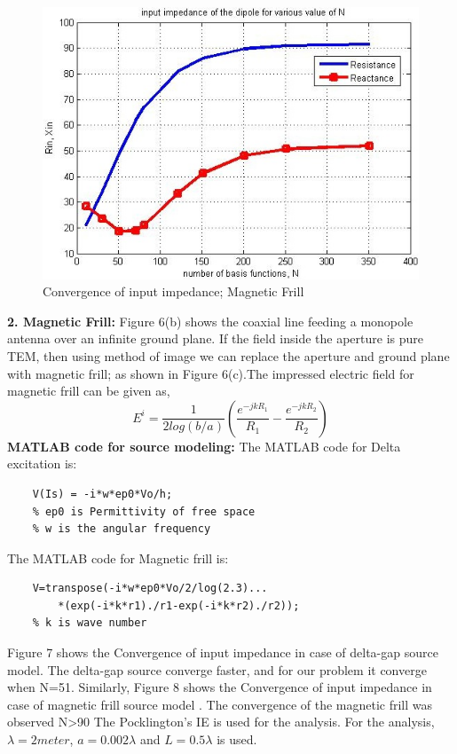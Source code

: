 \documentclass[aps,prstab,twocolumn,superscriptaddress,groupedaddress,showkeys,nofootinbib]{revtex4}  %
\begin{document}
\begin{figure}[here!]
\centering
\includegraphics[scale=0.5]{frill.jpg}
\caption{Convergence of input impedance; Magnetic Frill}
\end{figure}
\textbf{2. Magnetic Frill: } Figure 6(b) shows the coaxial line feeding a monopole antenna over an infinite ground plane. If the field inside the aperture is pure TEM, then using method of image we can replace the aperture and ground plane with magnetic frill; as shown in Figure 6(c).The impressed electric field for magnetic frill can be given as,
\begin{equation}
E^i=\frac{1}{2log(b/a)} \left ( \frac{e^{-jkR_1}}{R_1}-\frac{e^{-jkR_2}}{R_2} \right )
\end{equation}
\textbf{MATLAB code for source modeling: } The MATLAB code for Delta excitation is:
\begin{lstlisting}
	V(Is) = -i*w*ep0*Vo/h;
	% ep0 is Permittivity of free space
	% w is the angular frequency
\end{lstlisting}
The MATLAB code for Magnetic frill is:
\begin{lstlisting}
	V=transpose(-i*w*ep0*Vo/2/log(2.3)...
	    *(exp(-i*k*r1)./r1-exp(-i*k*r2)./r2));
	% k is wave number
\end{lstlisting}
Figure 7 shows the Convergence of input impedance in case of delta-gap source model. The delta-gap source converge faster, and for our problem it converge when N=51. Similarly, Figure 8 shows the Convergence of input impedance in case of magnetic frill source model . The convergence of the magnetic frill was observed N>90  The Pocklington's IE is used for the analysis. For the analysis, $ \lambda =2 meter $, $ a=0.002 \lambda $ and $ L= 0.5 \lambda $ is used. 
\end{document}
